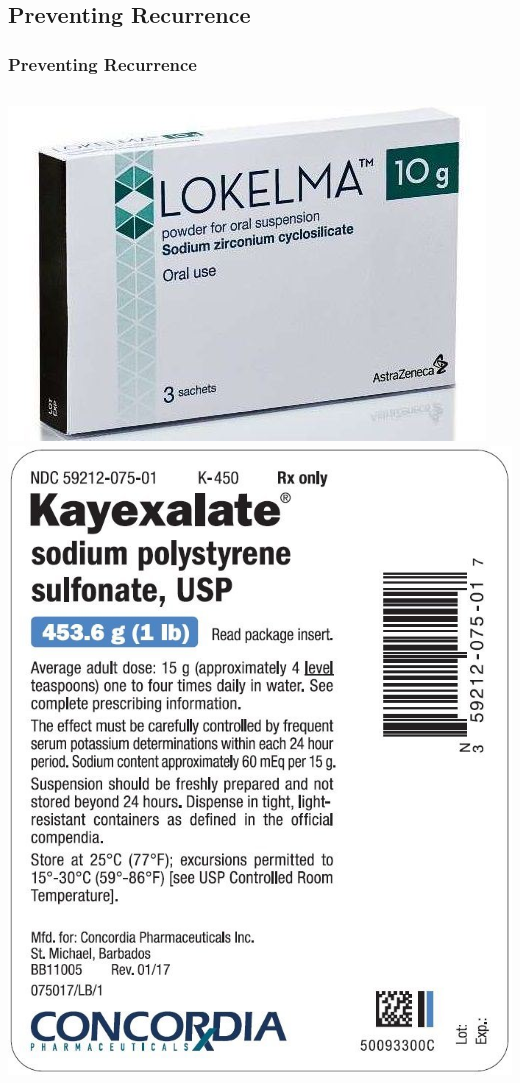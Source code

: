 \documentclass{beamer}
\begin{document}
\subsection{Preventing Recurrence}
\begin{frame}
	\frametitle{Preventing Recurrence}
	\pause
		\begin{columns}
			\centering
			\includegraphics[width=.9\textwidth,keepaspectratio]{media/lokelma.jpg}
			\centering
			\includegraphics[width=.9\textwidth,keepaspectratio]{media/kayexalate.jpg}
		\end{columns}
\end{frame}
\end{document}
